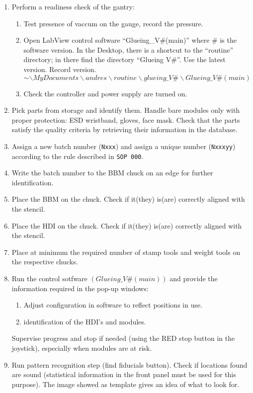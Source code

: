 \documentclass[12pt]{unlsilabsop}
\begin{document}
\begin{enumerate}
    \item Perform a readiness check of the gantry:
    \begin{enumerate}
        \item Test presence of vaccum on the gauge, record the pressure.
        \item Open LabView control software ``Glueing\_V\#(main)''  where $\#$ is the software version. In the Desktop, there is a shortcut to the ``routine'' directory; in there find the directory ``Glueing V\#''. Use the latest version. Record version.$$ \sim\backslash MyDocuments\backslash andres\backslash routine\backslash glueing\_V\#\backslash Glueing\_V\#(main)$$
        \item Check the controller and power supply are turned on.
    \end{enumerate}
    \item Pick parts from storage and identify them. Handle bare modules only with proper protection: ESD wristband, gloves, face mask. Check that the parts satisfy the quality criteria by retrieving their information in the database.
    \item Assign a new batch number (\texttt{Nxxx}) and assign a unique number (\texttt{Nxxxyy}) according to the rule described in \texttt{SOP~000}.
    \item Write the batch number to the BBM chuck on an edge for further identification.
    \item Place the BBM on the chuck. Check if it(they) is(are) correctly aligned with the stencil.
    \item Place the HDI on the chuck. Check if it(they) is(are) correctly aligned with the stencil.
    \item Place at minimum the required number of stamp tools and weight tools on the respective chucks.
    \item Run the control sotfware $(Glueing\_V\#(main))$ and provide the information required in the pop-up windows:
    \begin{enumerate}
        \item Adjust configuration in software to reflect positions in use.
        \item identification of the HDI's and modules.
    \end{enumerate}
    Supervise progress and stop if needed (using the RED stop button in the joystick), especially when modules are at risk.
    \item Run pattern recognition step (find fiducials button). Check if locations found are sound (statistical information in the front panel must be used for this purpose). The image showed as template gives an idea of what to look for. 

\end{enumerate}
\end{document}
